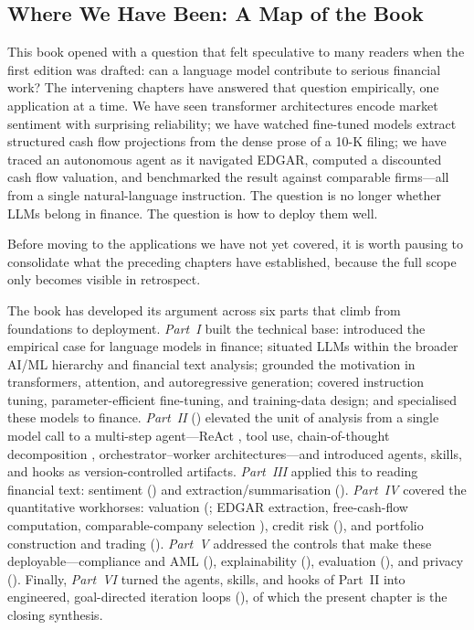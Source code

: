 \begin{context}

\subsection{Where We Have Been: A Map of the Book}
\label{subsec:af-survey-map}

This book opened with a question that felt speculative to many readers when the first edition was drafted: can a language model contribute to serious financial work? The intervening chapters have answered that question empirically, one application at a time. We have seen transformer architectures encode market sentiment with surprising reliability; we have watched fine-tuned models extract structured cash flow projections from the dense prose of a 10-K filing; we have traced an autonomous agent as it navigated EDGAR, computed a discounted cash flow valuation, and benchmarked the result against comparable firms---all from a single natural-language instruction. The question is no longer whether LLMs belong in finance. The question is how to deploy them well.

Before moving to the applications we have not yet covered, it is worth pausing to consolidate what the preceding chapters have established, because the full scope only becomes visible in retrospect.

The book has developed its argument across six parts that climb from
foundations to deployment. \emph{Part~I} built the technical base:
 introduced the empirical case for language models in finance;
 situated LLMs within the broader AI/ML hierarchy
and financial text analysis;  grounded the motivation
in transformers, attention, and autoregressive generation; 
covered instruction tuning, parameter-efficient fine-tuning, and training-data
design; and  specialised these models to finance.
\emph{Part~II} () elevated the unit of analysis from a single
model call to a multi-step agent---ReAct \cite{yao2022react}, tool use,
chain-of-thought decomposition \cite{wei2022chain}, orchestrator--worker
architectures---and introduced agents, skills, and hooks as version-controlled
artifacts. \emph{Part~III} applied this to reading financial text: sentiment
() and extraction/summarisation
(). \emph{Part~IV} covered the
quantitative workhorses: valuation (; EDGAR
extraction, free-cash-flow computation, comparable-company selection
\cite{damodaran2012investment}), credit risk (), and
portfolio construction and trading ().
\emph{Part~V} addressed the controls that make these deployable---compliance and
AML (), explainability
(), evaluation (),
and privacy (). Finally, \emph{Part~VI} turned
the agents, skills, and hooks of Part~II into engineered, goal-directed
iteration loops (), of which the present chapter
is the closing synthesis.


\end{context}
